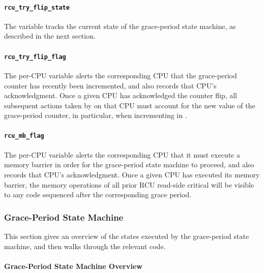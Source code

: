 \paragraph{{\tt rcu\_try\_flip\_state}}
\label{app:rcuimpl:rcu_try_flip_state}

The  variable tracks the current state of
the grace-period state machine, as described in the next section.

\paragraph{{\tt rcu\_try\_flip\_flag}}
\label{app:rcuimpl:rcu_try_flip_flag}

The  per-CPU variable alerts the corresponding
CPU that the grace-period counter has recently been incremented, and
also records that CPU's acknowledgment.
Once a given CPU has acknowledged the counter flip, all subsequent actions
taken by  on that CPU must account for the
new value of the grace-period counter, in particular, when incrementing
 in .

\paragraph{{\tt rcu\_mb\_flag}}
\label{app:rcuimpl:rcu_mb_flag}

The  per-CPU variable alerts the corresponding
CPU that it must execute a memory barrier in order for the grace-period
state machine to proceed, and also records that CPU's acknowledgment.
Once a given CPU has executed its memory barrier, the memory operations
of all prior RCU read-side critical will be visible to any code sequenced
after the corresponding grace period.


\subsubsection{Grace-Period State Machine}
\label{app:rcuimpl:Grace-Period State Machine}

This section gives an overview of the states executed by the grace-period
state machine, and then walks through the relevant code.

\paragraph{Grace-Period State Machine Overview}
\label{app:rcuimpl:Grace-Period State Machine Overview}

